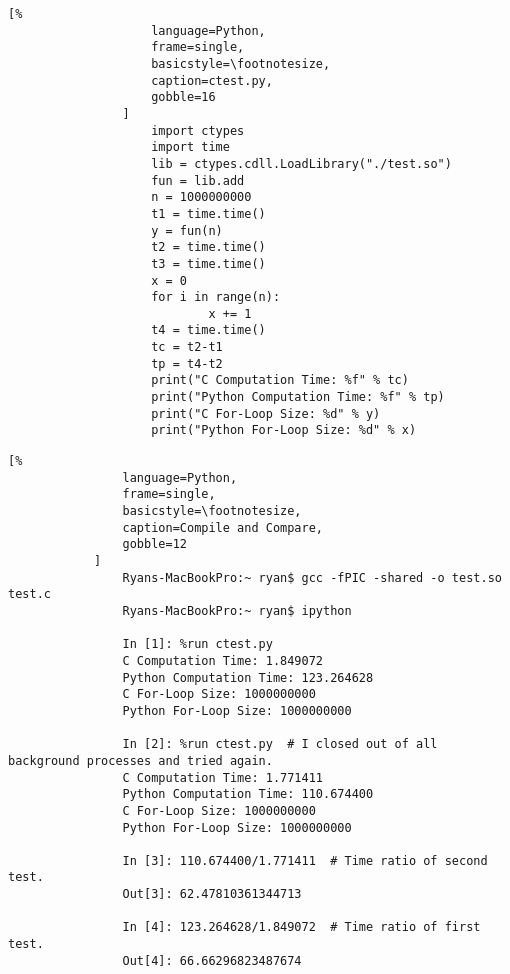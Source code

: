 \documentclass[crop=false,class=book]{standalone}
\begin{document}
            \begin{minipage}[t]{.48\textwidth}
                \centering
                \begin{lstlisting}[%
                    language=Python,
                    frame=single,
                    basicstyle=\footnotesize,
                    caption=ctest.py,
                    gobble=16
                ]
                    import ctypes
                    import time
                    lib = ctypes.cdll.LoadLibrary("./test.so")
                    fun = lib.add
                    n = 1000000000
                    t1 = time.time()
                    y = fun(n)
                    t2 = time.time()
                    t3 = time.time()
                    x = 0
                    for i in range(n):
                            x += 1
                    t4 = time.time()
                    tc = t2-t1
                    tp = t4-t2
                    print("C Computation Time: %f" % tc)
                    print("Python Computation Time: %f" % tp)
                    print("C For-Loop Size: %d" % y)
                    print("Python For-Loop Size: %d" % x)
                \end{lstlisting}
            \end{minipage}
            \begin{lstlisting}[%
                language=Python,
                frame=single,
                basicstyle=\footnotesize,
                caption=Compile and Compare,
                gobble=12
            ]
                Ryans-MacBookPro:~ ryan$ gcc -fPIC -shared -o test.so test.c
                Ryans-MacBookPro:~ ryan$ ipython
                
                In [1]: %run ctest.py
                C Computation Time: 1.849072
                Python Computation Time: 123.264628
                C For-Loop Size: 1000000000
                Python For-Loop Size: 1000000000
                
                In [2]: %run ctest.py  # I closed out of all background processes and tried again.
                C Computation Time: 1.771411
                Python Computation Time: 110.674400
                C For-Loop Size: 1000000000
                Python For-Loop Size: 1000000000
                
                In [3]: 110.674400/1.771411  # Time ratio of second test.
                Out[3]: 62.47810361344713
                
                In [4]: 123.264628/1.849072  # Time ratio of first test.
                Out[4]: 66.66296823487674
            \end{lstlisting}
\end{document}
